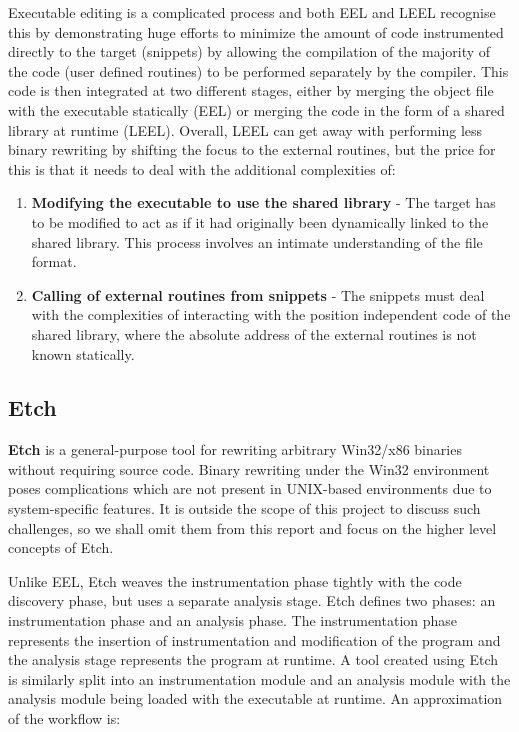 Executable editing is a complicated process and both EEL and LEEL recognise this by demonstrating huge efforts to minimize the amount of code instrumented directly to the target (snippets) by allowing the compilation of the majority of the code (user defined routines) to be performed separately by the compiler. This code is then integrated at two different stages, either by merging the object file with the executable statically (EEL) or merging the code in the form of a shared library at runtime (LEEL). Overall, LEEL can get away with performing less binary rewriting by shifting the focus to the external routines, but the price for this is that it needs to deal with the additional complexities of:

\begin{enumerate}
 \item \textbf{Modifying the executable to use the shared library} - The target has to be modified to act as if it had originally been dynamically linked to the shared library. This process involves an intimate understanding of the file format.
 \item \textbf{Calling of external routines from snippets} - The snippets must deal with the complexities of interacting with the position independent code of the shared library, where the absolute address of the external routines is not known statically.
\end{enumerate}

\subsection{Etch}

\textbf{Etch} is a general-purpose tool for rewriting arbitrary Win32/x86 binaries without requiring source code\cite{etch}. Binary rewriting under the Win32 environment poses complications which are not present in UNIX-based environments due to system-specific features. It is outside the scope of this project to discuss such challenges, so we shall omit them from this report and focus on the higher level concepts of Etch.

Unlike EEL, Etch weaves the instrumentation phase tightly with the code discovery phase, but uses a separate analysis stage. Etch defines two phases: an instrumentation phase and an analysis phase. The instrumentation phase represents the insertion of instrumentation and modification of the program and the analysis stage represents the program at runtime. A tool created using Etch is similarly split into an instrumentation module and an analysis module with the analysis module being loaded with the executable at runtime. An approximation of the workflow is:

